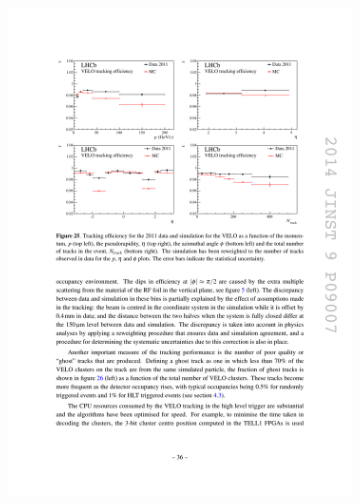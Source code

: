 \begin{figure}[!h]
    \centering
    \begin{subfigure}[t]{0.4\textwidth}
        \centering
        \includegraphics[width=1.0\textwidth]{figs/Detector/velo_track_eff_2011.pdf}
    \end{subfigure}
    \begin{subfigure}[t]{0.4\textwidth}
        \centering

\end{subfigure}
\end{figure}
